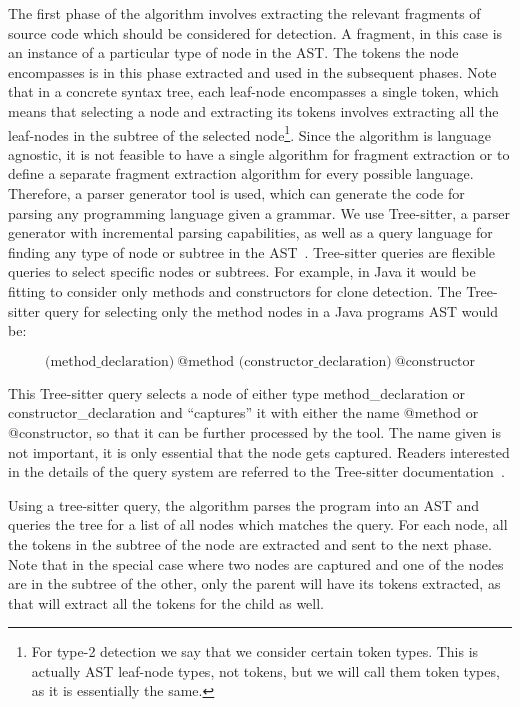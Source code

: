 The first phase of the algorithm involves extracting the relevant fragments of source code
which should be considered for detection. A fragment, in this case is an instance of a
particular type of node in the AST. The tokens the node encompasses is in this phase
extracted and used in the subsequent phases. Note that in a concrete syntax tree, each
leaf-node encompasses a single token, which means that selecting a node and extracting its
tokens involves extracting all the leaf-nodes in the subtree of the selected
node\footnote{For type-2 detection we say that we consider certain token types. This is
actually AST leaf-node types, not tokens, but we will call them token types, as it is
essentially the same.}. Since the algorithm is language agnostic, it is not feasible to
have a single algorithm for fragment extraction or to define a separate fragment
extraction algorithm for every possible language. Therefore, a parser generator tool is
used, which can generate the code for parsing any programming language given a grammar. We
use Tree-sitter, a parser generator with incremental parsing capabilities, as well as a
query language for finding any type of node or subtree in the AST~\cite{treesitter}.
Tree-sitter queries are flexible queries to select specific nodes or subtrees. For
example, in Java it would be fitting to consider only methods and constructors for clone
detection. The Tree-sitter query for selecting only the method nodes in a Java programs
AST would be:

\begin{equation}
    (\mathrm{method\_declaration)\ } \text{@method } (\mathrm{constructor\_declaration)\ } \text{@constructor}
\end{equation}

This Tree-sitter query selects a node of either type method\_declaration or
constructor\_declaration and ``captures'' it with either the name @method or @constructor,
so that it can be further processed by the tool. The name given is not important, it is
only essential that the node gets captured. Readers interested in the details of the query
system are referred to the Tree-sitter documentation~\cite{treesitter}.

Using a tree-sitter query, the algorithm parses the program into an AST and queries the
tree for a list of all nodes which matches the query. For each node, all the tokens in the
subtree of the node are extracted and sent to the next phase. Note that in the special
case where two nodes are captured and one of the nodes are in the subtree of the other,
only the parent will have its tokens extracted, as that will extract all the tokens for
the child as well.

